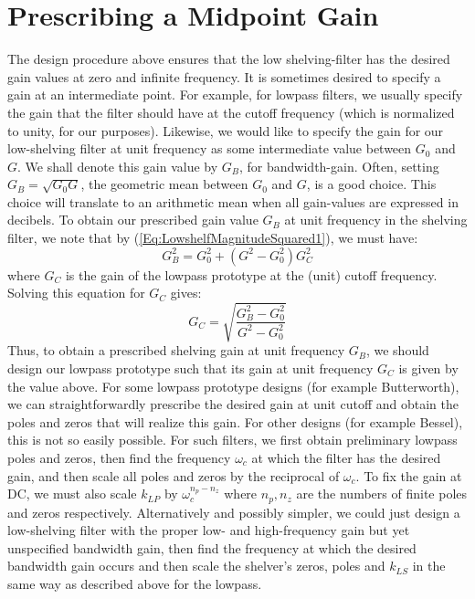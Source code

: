 \section{Prescribing a Midpoint Gain}
The design procedure above ensures that the low shelving-filter has the desired gain values at zero and infinite frequency. It is sometimes desired to specify a gain at an intermediate point. For example, for lowpass filters, we usually specify the gain that the filter should have at the  cutoff frequency (which is normalized to unity, for our purposes). Likewise, we would like to specify the gain for our low-shelving filter at unit frequency as some intermediate value between $G_0$ and $G$. We shall denote this gain value by $G_B$, for bandwidth-gain. Often, setting $G_B = \sqrt{G_0 G}$, the geometric mean between $G_0$ and $G$, is a good choice. This choice will translate to an arithmetic mean when all gain-values are expressed in decibels. To obtain our prescribed gain value $G_B$ at unit frequency in the shelving filter, we note that by (\ref{Eq:LowshelfMagnitudeSquared1}), we must have:
\begin{equation}
 G_B^2 = G_0^2 + (G^2 - G_0^2) G_C^2
\end{equation}
where $G_C$ is the gain of the lowpass prototype at the (unit) cutoff frequency. Solving this equation for $G_C$ gives:
\begin{equation}
 G_C = \sqrt{ \frac{G_B^2 - G_0^2}{G^2 - G_0^2} }
\end{equation}
Thus, to obtain a prescribed shelving gain at unit frequency $G_B$, we should design our lowpass prototype such that its gain at unit frequency $G_C$ is given by the value above. For some lowpass prototype designs (for example Butterworth), we can straightforwardly prescribe the desired gain at unit cutoff and obtain the poles and zeros that will realize this gain. For other designs (for example Bessel), this is not so easily possible. For such filters, we first obtain preliminary lowpass poles and zeros, then find the frequency $\omega_c$  at which the filter has the desired gain, and then scale all poles and zeros by the reciprocal of $\omega_c$. To fix the gain at DC, we must also scale $k_{LP}$ by $\omega_c^{n_p-n_z}$ where $n_p, n_z$ are the numbers of finite poles and zeros respectively. Alternatively and possibly simpler, we could just design a low-shelving filter with the proper low- and high-frequency gain but yet unspecified bandwidth gain, then find the frequency at which the desired bandwidth gain occurs and then scale the shelver's zeros, poles and $k_{LS}$ in the same way as described above for the lowpass.

